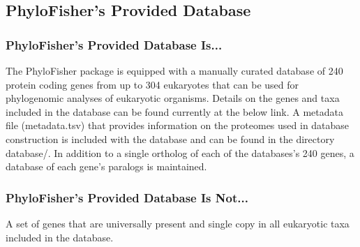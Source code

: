 \documentclass{article}
\begin{document}
        \subsection{PhyloFisher's Provided Database}
        
            \subsubsection{PhyloFisher's Provided Database Is...}
                The PhyloFisher package is equipped with a manually curated database of 240 protein coding genes from up to 304 eukaryotes that can be used for phylogenomic analyses of eukaryotic organisms. Details on the genes and taxa included in the database can be found currently at the below link.  A metadata file (metadata.tsv) that provides information on the proteomes used in database construction is included with the database and can be found in the directory database/. In addition to a single ortholog of each of the databases’s 240 genes, a database of each gene's paralogs is maintained.
                
            \subsubsection{PhyloFisher's Provided Database Is Not...}
                A set of genes that are universally present and single copy in all eukaryotic taxa included in the database.
                
\end{document}
